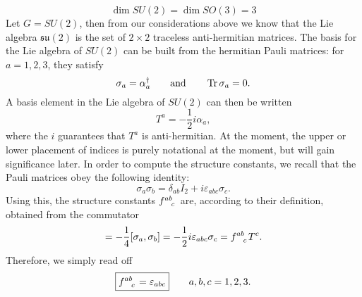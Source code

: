 \begin{example}[]
  \begin{equation}
    \dim SU(2) = \dim SO(3) = 3
  \end{equation}
  Let $G = SU(2)$, then from our considerations above we know that the Lie algebra $\mathfrak{su}(2)$ is the set of $2\times 2$ traceless anti-hermitian matrices.
  The basis for the Lie algebra of $SU(2)$ can be built from the hermitian Pauli matrices: for $a = 1, 2, 3$, they satisfy
  \begin{equation}
    \sigma_a = \alpha_a^{\dagger} \qquad \text{and} \qquad \Tr \sigma_a = 0.
  \end{equation}
  A basis element in the Lie algebra of $SU(2)$ can then be written
  \begin{equation}
    T^a = -\frac{1}{2} i \alpha_a,
  \end{equation}
  where the $i$ guarantees that $T^a$ is anti-hermitian.
  At the moment, the upper or lower placement of indices is purely notational at the moment, but will gain significance later.
  In order to compute the structure constants, we recall that the Pauli matrices obey the following identity:
  \begin{equation}
    \sigma_a \sigma_b = \delta_{ab} I_2 + i \varepsilon_{abc} \sigma_c.
  \end{equation}
  Using this, the structure constants $f \indices{^{ab}_c}$ are, according to their definition, obtained from the commutator
  \begin{equation}
    [T^a, T^b] = -\frac{1}{4} [\sigma_a, \sigma_b] = -\frac{1}{2} i \varepsilon_{abc} \sigma_c = f \indices{^{ab}_c} T^c .
  \end{equation}
  Therefore, we simply read off
  \begin{equation}
    \boxed{f \indices{^{ab}_c} = \varepsilon_{abc}} \qquad a,b,c = 1,2,3.
  \end{equation}
\end{example}

